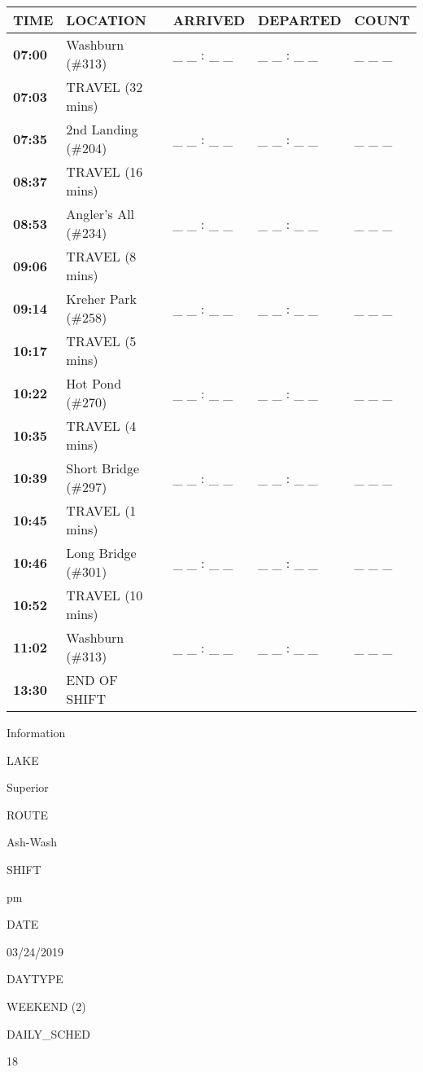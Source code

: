 \documentclass[]{article}
\begin{document}
\begin{tabular}{>{\bfseries}lllll}
\toprule
\textbf{TIME} & \textbf{LOCATION} & \textbf{ARRIVED} & \textbf{DEPARTED} & \textbf{COUNT}\\
\midrule
07:00 & Washburn (\#313) & \_ \_ : \_ \_ & \_ \_ : \_ \_ & \_ \_ \_\\
07:03 & TRAVEL (32 mins) &  &  & \\
07:35 & 2nd Landing (\#204) & \_ \_ : \_ \_ & \_ \_ : \_ \_ & \_ \_ \_\\
08:37 & TRAVEL (16 mins) &  &  & \\
08:53 & Angler's All (\#234) & \_ \_ : \_ \_ & \_ \_ : \_ \_ & \_ \_ \_\\
09:06 & TRAVEL (8 mins) &  &  & \\
09:14 & Kreher Park (\#258) & \_ \_ : \_ \_ & \_ \_ : \_ \_ & \_ \_ \_\\
10:17 & TRAVEL (5 mins) &  &  & \\
10:22 & Hot Pond (\#270) & \_ \_ : \_ \_ & \_ \_ : \_ \_ & \_ \_ \_\\
10:35 & TRAVEL (4 mins) &  &  & \\
10:39 & Short Bridge (\#297) & \_ \_ : \_ \_ & \_ \_ : \_ \_ & \_ \_ \_\\
10:45 & TRAVEL (1 mins) &  &  & \\
10:46 & Long Bridge (\#301) & \_ \_ : \_ \_ & \_ \_ : \_ \_ & \_ \_ \_\\
10:52 & TRAVEL (10 mins) &  &  & \\
11:02 & Washburn (\#313) & \_ \_ : \_ \_ & \_ \_ : \_ \_ & \_ \_ \_\\
13:30 & END OF SHIFT &  &  & \\
\bottomrule
\end{tabular}\newpage

Information

LAKE

Superior

ROUTE

Ash-Wash

SHIFT

pm

DATE

03/24/2019

DAYTYPE

WEEKEND (2)

DAILY\_SCHED

18

\vspace{24pt}
\end{document}
